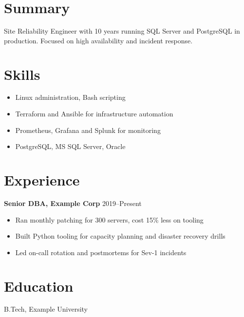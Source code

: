 \documentclass[11pt]{article}
\begin{document}
\section{Summary}
Site Reliability Engineer with 10 years running SQL Server and PostgreSQL in production.
Focused on high availability and incident response.

\section{Skills}
\begin{itemize}
  \item Linux administration, Bash scripting
  \item Terraform and Ansible for infrastructure automation
  \item Prometheus, Grafana and Splunk for monitoring
  \item PostgreSQL, MS SQL Server, Oracle
\end{itemize}

\section{Experience}
\textbf{Senior DBA, Example Corp} \hfill 2019--Present
\begin{itemize}
  \item Ran monthly patching for 300 servers, cost 15\% less on tooling
  \item Built Python tooling for capacity planning and disaster recovery drills
  \item Led on-call rotation and postmortems for Sev-1 incidents
\end{itemize}

\section{Education}
B.Tech, Example University
\end{document}
